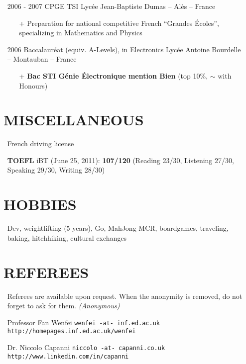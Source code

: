 \documentclass{res}
\begin{document}
\begin{resume}
\begin{itemize}
\item[] 2006 - 2007 \tabto{2cm} CPGE TSI \hfill Lyc\'ee Jean-Baptiste Dumas -- Al\`es -- France
        \begin{itemize}
                \item[+] Preparation for national competitive French ``Grandes \'Ecoles'', specializing in Mathematics and Physics
        \end{itemize}
        
\item[] 2006 \tabto{2cm} Baccalaur\'eat (equiv. A-Levels), in Electronics \hfill Lyc\'ee Antoine Bourdelle -- Montauban -- France
        \begin{itemize}
                \item[+] \textbf{Bac STI G\'enie \'Electronique mention Bien} (top 10\%, $\sim$ with Honours)
        \end{itemize}
\end{itemize}

\section{\faMagic~MISCELLANEOUS}
        \begin{itemize}
                \item[] French driving license
                \item[] \textbf{TOEFL} iBT (June 25, 2011): \textbf{107/120} (Reading 23/30, Listening 27/30, Speaking 29/30, Writing 28/30)
                    \end{itemize} 
 
\section{\faGamepad~HOBBIES}
        \begin{itemize}
                \item[] Dev, weightlifting (5 years), Go, MahJong MCR, boardgames, traveling, baking, hitchhiking, cultural exchanges
        \end{itemize}

\section{\faUserCheck~REFEREES}
\ifisanon 
     \begin{itemize}
         \item[] Referees are available upon request. When the anonymity is removed, do not forget to ask for them. \textit{(Anonymous)}
     \end{itemize}
\else
                \begin{itemize}
                        \item[] Professor Fan Wenfei \tabto{5cm} \texttt{wenfei -at- inf.ed.ac.uk} \hfill \texttt{http://homepages.inf.ed.ac.uk/wenfei}
                        \item[] Dr. Niccolo Capanni \tabto{5cm} \texttt{niccolo -at- capanni.co.uk} \hfill \texttt{http://www.linkedin.com/in/capanni}
                \end{itemize}
\fi
\end{resume} 
\end{document}
